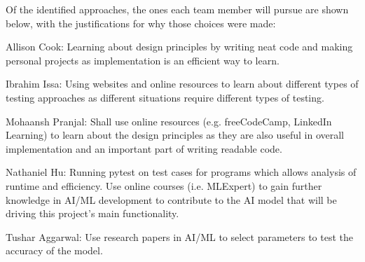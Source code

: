 \documentclass[12pt, titlepage]{article}
\begin{document}
Of the identified approaches, the ones each team member will pursue are shown below, with the justifications for why those choices were made:
\begin{enumerate}
    \begin{item}
        Allison Cook: Learning about design principles by writing neat code and making personal projects as implementation is an efficient way to learn.
    \end{item}
    \begin{item}
        Ibrahim Issa: Using websites and online resources to learn about different types of testing approaches as different situations require different types of testing.
    \end{item}
    \begin{item}
        Mohaansh Pranjal: Shall use online resources (e.g. freeCodeCamp, LinkedIn Learning) to learn about the design principles as they are also useful in overall implementation and an important part of writing readable code.
    \end{item}
    \begin{item}
        Nathaniel Hu: Running pytest on test cases for programs which allows analysis of runtime and efficiency. Use online courses (i.e. MLExpert) to gain further knowledge in AI/ML development to contribute to the AI model that will be driving this project's main functionality.
    \end{item}
    \begin{item}
        Tushar Aggarwal: Use research papers in AI/ML to select parameters to test the accuracy of the model.
    \end{item}
\end{enumerate}
\end{document}
